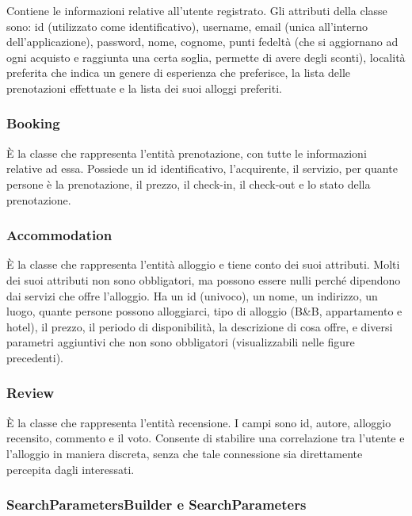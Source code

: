 \documentclass[10pt]{article}
\begin{document}
Contiene le informazioni relative all'utente registrato. Gli attributi della classe sono: id (utilizzato come identificativo), username, email (unica all'interno dell'applicazione), password, nome, cognome, punti fedeltà (che si aggiornano ad ogni acquisto e raggiunta una certa soglia, permette di avere degli sconti), località preferita che indica un genere di esperienza che preferisce, la lista delle prenotazioni effettuate e la lista dei suoi alloggi preferiti. 

\subsubsection{Booking}

\`E la classe che rappresenta l'entità prenotazione, con tutte le informazioni relative ad essa. Possiede un id identificativo, l'acquirente, il servizio, per quante persone è la prenotazione, il prezzo, il check-in, il check-out e lo stato della prenotazione.

\subsubsection{Accommodation}

\`E la classe che rappresenta l'entità alloggio e tiene conto dei suoi attributi. Molti dei suoi attributi non sono obbligatori, ma possono essere nulli perché dipendono dai servizi che offre l'alloggio. Ha un id (univoco), un nome, un indirizzo, un luogo, quante persone possono alloggiarci, tipo di alloggio (B\&B, appartamento e hotel), il prezzo, il periodo di disponibilità, la descrizione di cosa offre, e diversi parametri aggiuntivi che non sono obbligatori (visualizzabili nelle figure precedenti).

\subsubsection{Review}

\`E la classe che rappresenta l'entità recensione. I campi sono id, autore, alloggio recensito, commento e il voto. Consente di stabilire una correlazione tra l'utente e l'alloggio in maniera discreta, senza che tale connessione sia direttamente percepita dagli interessati.

\subsubsection{SearchParametersBuilder e SearchParameters}
\end{document}
